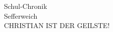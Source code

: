
\begin{center}
\Large Schul-Chronik\\[1em]
\Large Sefferweich\\[1em]
\Large CHRISTIAN IST DER GEILSTE!\\[1em]
\end{center}
\pend
